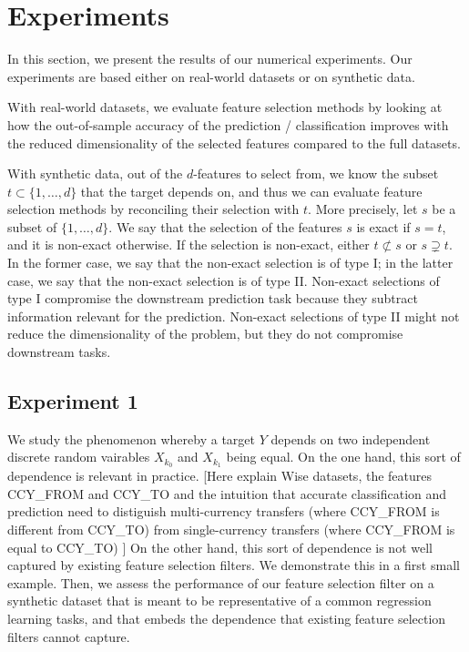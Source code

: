 \section{Experiments}
In this section,
we present the results of our numerical experiments.
Our experiments are based
either 
on real-world datasets
or on synthetic data.

With real-world datasets,
we evaluate
feature selection methods
by looking at 
how
the out-of-sample accuracy of the prediction / classification
improves with the reduced dimensionality of the selected features
compared to the full datasets.

With synthetic data, 
out 
of the $d$-features to select from,
we know the subset 
$t \subset \lbrace 1, \dots, d\rbrace$
that the target depends on,
and thus
we can evaluate feature selection methods
by reconciling their selection with $t$.
More precisely,
let 
$s$ 
be a subset of 
$\lbrace1, \dots, d\rbrace$.
We say that 
the selection of the features 
$s$ is exact if $s=t$,
and it is non-exact otherwise. 
If the selection is non-exact,
either 
$t \not \subset s$
or
$s \supsetneq t$.
In the former case, 
we say that the non-exact selection is of type I;
in the latter case,
we say that the non-exact selection is of type II. 
Non-exact selections of type I 
compromise the downstream prediction task 
because 
they subtract information relevant for the prediction.
Non-exact selections of type II
might not reduce the dimensionality of the problem,
but they do not compromise downstream tasks. 


\subsection{Experiment 1}
We study the phenomenon
whereby
a target $Y$ depends
on two independent discrete random vairables 
$X_{k_0}$ 
and
$X_{k_1}$
being equal. 
On the one hand, 
this sort of dependence is relevant in practice.
[Here explain Wise datasets, 
the features CCY\_FROM and CCY\_TO
and the intuition that 
accurate 
classification and prediction 
need to distiguish 
multi-currency transfers 
(where CCY\_FROM is different from CCY\_TO)
from 
single-currency transfers
(where CCY\_FROM is equal to CCY\_TO)
]
On the other hand,
this sort of dependence is not well captured by
existing feature selection filters. 
We demonstrate this in a first small example.
Then,
we assess the performance of our feature selection filter 
on a synthetic dataset that 
is meant to be representative of a common regression learning tasks,
and that embeds the dependence that 
existing feature selection filters cannot capture.

